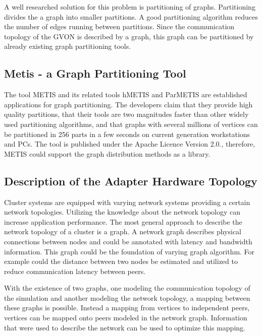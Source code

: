 A well researched solution for this problem is partitioning of
graphs. Partitioning divides the a graph into smaller partitions.  A
good partitioning algorithm reduces the number of edges running
between partitions.  Since the communication topology of the GVON is
described by a graph, this graph can be partitioned by already
existing graph partitioning tools.

\subsection*{Metis - a Graph Partitioning Tool}
The tool METIS and its related tools hMETIS and ParMETIS are
established applications for graph partitioning. The developers claim
that they provide high quality partitions, that their tools are two
magnitudes faster than other widely used partitioning algorithms, and
that graphs with several millions of vertices can be partitioned in
256 parts in a few seconds on current generation workstations and PCs.
The tool is published under the Apache Licence Version 2.0.,
therefore, METIS could support the graph distribution methods as
a library.
  
\subsection*{Description of the Adapter Hardware Topology}

Cluster systems are equipped with varying network systems providing a
certain network topologies.  Utilizing the knowledge about the network
topology can increase application performance.  The most general
approach to describe the network topology of a cluster is a graph. A
network graph describes physical connections between nodes and could
be annotated with latency and bandwidth information.  This graph could
be the foundation of varying graph algorithm. For example could the
distance between two nodes be estimated and utilized to reduce
communication latency between peers.

With the existence of two graphs, one modeling the communication
topology of the simulation and another modeling the network
topology, a mapping between these graphs is possible.  Instead a
mapping from vertices to independent peers, vertices can be mapped
onto peers modeled in the network graph. Information that were used
to describe the network can be used to optimize this mapping.

